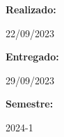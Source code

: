\documentclass[a4paper]{article}
\begin{document}
\begin{titlepage}
        \raggedright{\huge\textbf{Realizado:}}
        \par\vspace{0.5cm}
        \centering
        {\huge{22/09/2023}}
        \par\vspace{0.5cm}

        \raggedright{\huge\textbf{Entregado:}}
        \par\vspace{0.5cm}
        \centering
        {\huge{29/09/2023}}
        \par\vspace{0.5cm}

        \raggedright{\huge\textbf{Semestre:}}
        \par\vspace{0.5cm}
        \centering
        {\huge{2024-1}}
        \par\vspace{0.5cm}

        \vfill

    \end{titlepage}
    
\end{document}
